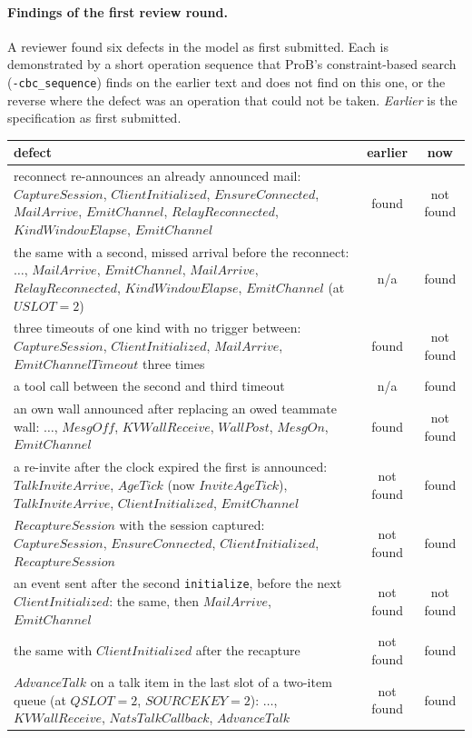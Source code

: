 \documentclass[a4paper,10pt,fleqn]{article}
\begin{document}
\paragraph{Findings of the first review round.}  A reviewer found six defects
in the model as first submitted.  Each is demonstrated by a short operation
sequence that ProB's constraint-based search (\texttt{-cbc\_sequence}) finds
on the earlier text and does not find on this one, or the reverse where the
defect was an operation that could not be taken.  \emph{Earlier} is the
specification as first submitted.
\begin{center}
\small
\begin{tabular}{p{}cc}
  defect & earlier & now \\ \hline
  reconnect re-announces an already announced mail:
    $CaptureSession$, $ClientInitialized$, $EnsureConnected$, $MailArrive$,
    $EmitChannel$, $RelayReconnected$, $KindWindowElapse$, $EmitChannel$ &
    found & not found \\
  the same with a second, missed arrival before the reconnect:
    $\ldots$, $MailArrive$, $EmitChannel$, $MailArrive$,
    $RelayReconnected$, $KindWindowElapse$, $EmitChannel$ (at $USLOT = 2$) &
    n/a & found \\
  three timeouts of one kind with no trigger between:
    $CaptureSession$, $ClientInitialized$, $MailArrive$,
    $EmitChannelTimeout$ three times &
    found & not found \\
  a tool call between the second and third timeout &
    n/a & found \\
  an own wall announced after replacing an owed teammate wall:
    $\ldots$, $MesgOff$, $KVWallReceive$, $WallPost$, $MesgOn$,
    $EmitChannel$ & found & not found \\
  a re-invite after the clock expired the first is announced:
    $TalkInviteArrive$, $AgeTick$ (now $InviteAgeTick$), $TalkInviteArrive$,
    $ClientInitialized$, $EmitChannel$ & not found & found \\
  $RecaptureSession$ with the session captured:
    $CaptureSession$, $EnsureConnected$, $ClientInitialized$,
    $RecaptureSession$ & not found & found \\
  an event sent after the second \texttt{initialize}, before the next
    $ClientInitialized$: the same, then $MailArrive$, $EmitChannel$ &
    not found & not found \\
  the same with $ClientInitialized$ after the recapture &
    not found & found \\
  $AdvanceTalk$ on a talk item in the last slot of a two-item queue
    (at $QSLOT = 2$, $SOURCEKEY = 2$):
    $\ldots$, $KVWallReceive$, $NatsTalkCallback$, $AdvanceTalk$ &
    not found & found \\
\end{tabular}
\end{center}
\end{document}
